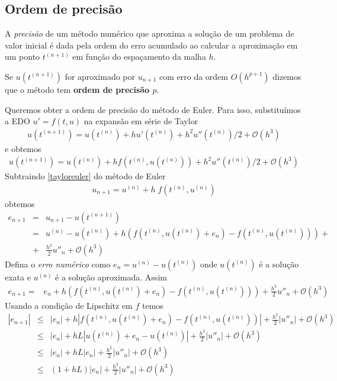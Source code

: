 \subsection{Ordem de precisão}




A \emph{precisão} de um método numérico que aproxima a solução de um problema de valor inicial é dada pela ordem do erro acumulado ao calcular a aproximação em um ponto $t^{(n+1)}$ em função do espaçamento da malha $h$.

Se $u(t^{(n+1)})$ for aproximado por $u_{n+1}$ com erro da ordem $O(h^{p+1})$ dizemos que o método tem \textbf{ordem de precisão $p$}.


Queremos obter a ordem de precisão do método de Euler. Para isso, substituímos a EDO $u'=f(t,u)$ na expansão em série de Taylor
\begin{eqnarray}\label{taylor}
   u(t^{(n+1)})=u(t^{(n)})+hu'(t^{(n)})+h^2u''(t^{(n)})/2+ \mathcal O(h^3)
\end{eqnarray}
e obtemos
\begin{eqnarray}\label{tayloreuler}
 u(t^{(n+1)})=u(t^{(n)})+hf(t^{(n)},u(t^{(n)}))+h^2u''(t^{(n)})/2+ \mathcal O(h^3)
\end{eqnarray}
Subtraindo \eqref{tayloreuler} do método de Euler
\begin{eqnarray}
    u_{n+1}=u^{(n)} + h\;f(t^{(n)},u^{(n)})
\end{eqnarray}
obtemos
\begin{eqnarray}
   e_{n+1}   &=& u_{n+1}-u(t^{(n+1)}) \\
             &=&u^{(n)} - u(t^{(n)})  +h(f(t^{(n)},u(t^{(n)})+e_n)- f(t^{(n)},u(t^{(n)}))) +\\
             &+&\frac{h^2}{2}u''_n+\mathcal O(h^3)
\end{eqnarray}
Defina o \emph{erro numérico} como $e_n=u^{(n)}-u(t^{(n)})$ onde $u(t^{(n)})$ é a solução exata e $u^{(n)}$ é a solução aproximada. Assim
\begin{eqnarray}
   e_{n+1}    =&e_n + h(f(t^{(n)},u(t^{(n)})+e_n)- f(t^{(n)},u(t^{(n)}))) +\frac{h^2}{2}u''_n+\mathcal O(h^3)
\end{eqnarray}
Usando a condição de Lipschitz em $f$  temos
\begin{eqnarray}
   |e_{n+1}|      &\le &  |e_n| + h|f(t^{(n)},u(t^{(n)})+e_n)- f(t^{(n)},u(t^{(n)}))|+\frac{h^2}{2}|u''_n|+\mathcal O(h^3)\\
                  &\le &  |e_n| + hL |u(t^{(n)})+e_n- u(t^{(n)})|+\frac{h^2}{2}|u''_n|+\mathcal O(h^3)\\
                  &\le &  |e_n| + hL |e_n|+\frac{h^2}{2}|u''_n|+\mathcal O(h^3)\\
                  &\le &  (1+ hL) |e_n|+\frac{h^2}{2}|u''_n|+\mathcal O(h^3)
\end{eqnarray}

